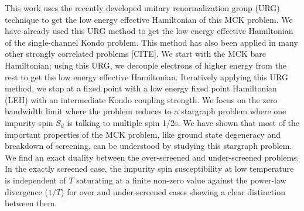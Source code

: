 \documentclass[reprint,prb,superscriptaddress]{revtex4-2}
\begin{document}
This work uses the recently developed unitary renormalization group (URG) technique to get the low energy effective Hamiltonian of this MCK problem. We have already used this URG method to get the low energy effective Hamiltonian of the single-channel Kondo problem. This method has also been applied in many other strongly correlated problems [CITE]. We start with the MCK bare Hamiltonian; using this URG, we decouple electrons of higher energy from the rest to get the low energy effective Hamiltonian. Iteratively applying this URG method, we stop at a fixed point with a low energy fixed point Hamiltonian (LEH) with an intermediate Kondo coupling strength. We focus on the zero bandwidth limit where the problem reduces to a stargraph problem where one impurity spin $S_d$ is talking to multiple spin 1/2s. We have shown that most of the important properties of the MCK problem, like ground state degeneracy and breakdown of screening, can be understood by studying this stargraph problem. We find an exact duality between the over-screened and under-screened problems. In the exactly screened case, the impurity spin susceptibility at low temperature is independent of $T$ saturating at a finite non-zero value against the power-law divergence ($1/T$) for over and under-screened cases showing a clear distinction between them.
\end{document}
